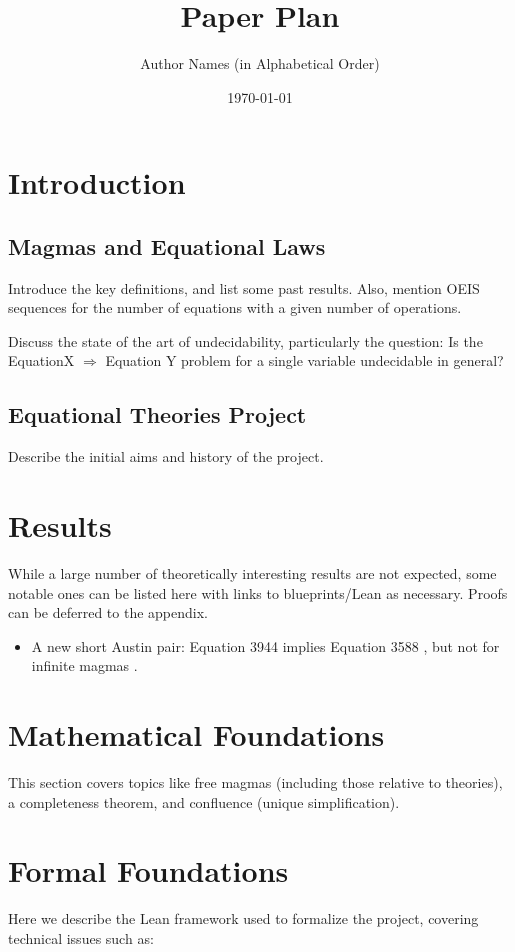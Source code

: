 \documentclass[12pt]{article}
\title{Paper Plan}
\author{Author Names (in Alphabetical Order)}
\date{\today}
\theoremstyle{definition}
\begin{document}
\maketitle

\tableofcontents

\section{Introduction}

\subsection{Magmas and Equational Laws}
Introduce the key definitions, and list some past results. Also, mention OEIS sequences for the number of equations with a given number of operations.

Discuss the state of the art of undecidability, particularly the question: Is the EquationX $\Rightarrow$ Equation Y problem for a single variable undecidable in general?

\subsection{Equational Theories Project}
Describe the initial aims and history of the project.

\section{Results}
While a large number of theoretically interesting results are not expected, some notable ones can be listed here with links to blueprints/Lean as necessary. Proofs can be deferred to the appendix.

\begin{itemize}
    \item A new short Austin pair: Equation 3944 implies Equation 3588 \cite{finite_magmas}, but not for infinite magmas \cite{infinite_magmas}.
\end{itemize}

\section{Mathematical Foundations}
This section covers topics like free magmas (including those relative to theories), a completeness theorem, and confluence (unique simplification).

\section{Formal Foundations}
Here we describe the Lean framework used to formalize the project, covering technical issues such as:
\end{document}
